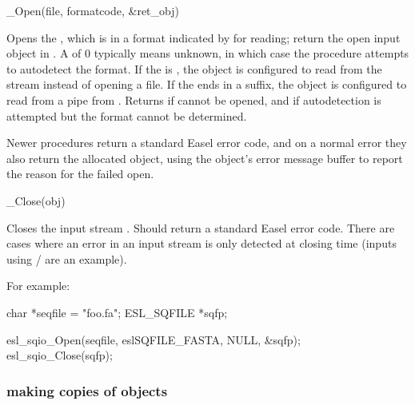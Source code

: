 \begin{sreapi}
\hypertarget{ifc:Open} 
{\item[\_Open(file, formatcode, \&ret\_obj)]}

Opens the , which is in a format indicated by
 for reading; return the open input object in
. A  of 0 typically means unknown,
in which case the  procedure attempts to autodetect
the format. If the  is , the object is
configured to read from the  stream instead of opening a
file. If the  ends in a  suffix, the object is
configured to read from a pipe from . Returns
 if  cannot be opened, and
 if autodetection is attempted but the format cannot
be determined. 

Newer  procedures return a standard Easel error code,
and on a normal error they also return the allocated object, using the
object's error message buffer to report the reason for the failed
open.

\hypertarget{ifc:Close} 
{\item[\_Close(obj)]}

Closes the input stream . Should return a standard Easel
error code. There are cases where an error in an input stream is only
detected at closing time (inputs using /
  are an example).
\end{sreapi}

For example:
\begin{cchunk}
    char        *seqfile = "foo.fa";
    ESL_SQFILE  *sqfp;

    esl_sqio_Open(seqfile, eslSQFILE_FASTA, NULL, &sqfp);
    esl_sqio_Close(sqfp);
\end{cchunk}


  \subsubsection{making copies of objects}

